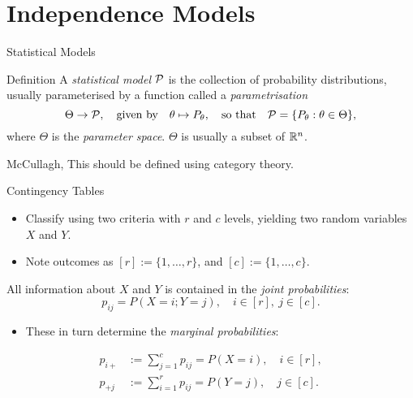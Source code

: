 \section{Independence Models}

\begin{frame}{Statistical Models}
    \begin{block}{Definition}
    A \emph{statistical model} $\mathcal{P}$ is the collection of probability distributions, usually parameterised by a function  called a \emph{parametrisation}
    $$ \Theta \rightarrow \mathcal{P}, \quad \text{given by} \quad \theta \mapsto P_{\theta},\quad \text{so that}\quad \mathcal{P} = \{ P_{\theta} : \theta \in \Theta \}, $$
    where $\Theta$ is the \emph{parameter space}. $\Theta$ is usually a subset of $\mathbb{R}^{n}$.
    \end{block}

    \begin{block}{McCullagh, \cite{PM2002}}
    This should be defined using category theory.
    \end{block}

\end{frame}

\begin{frame}{Contingency Tables}
    
    \begin{itemize}
        \item Classify using two criteria with $r$ and $c$ levels, yielding two random variables $X$ and $Y$. 
        \item Note outcomes as $[r] := \{1,\ldots, r\}$, and $[c] := \{ 1, \ldots, c \}$.
    \end{itemize}
    
    All information about $X$ and $Y$ is contained in the \emph{joint probabilities}:
    $$ p_{ij} = P(X = i; Y = j), \quad i \in [r],\ j \in [c]. $$

    \begin{itemize}
        \item These in turn determine the \emph{marginal probabilities}:
    \end{itemize}
    \vspace*{-12pt}
    \begin{equation*}
        \begin{split}
            p_{i+} &:= \sum_{j = 1}^{c} p_{ij} = P(X = i), \quad i \in [r], \\
            p_{+j} &:= \sum_{i = 1}^{r} p_{ij} = P(Y = j), \quad j \in [c].
        \end{split}
    \end{equation*}

\end{frame}

